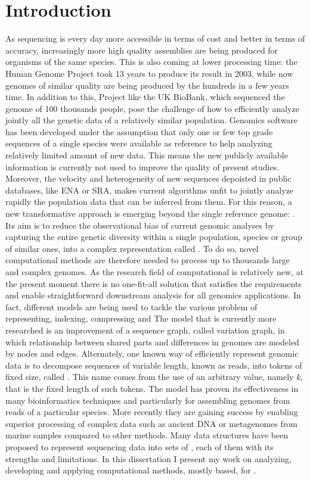 \chapter{Introduction}
\label{sec:intro}

As sequencing is every day more accessible in terms of cost and better in terms of accuracy, increasingly more high quality assemblies are being produced for organisms of the same species. This is also coming at lower processing time: the Human Genome Project took 13 years to produce its result in 2003, while now genomes of similar quality are being produced by the hundreds in a few years time. In addition to this, Project like the UK BioBank, which sequenced the genome of 100 thousands people, pose the challenge of how to efficiently analyze jointly all the genetic data of a relatively similar population.
Genomics software has been developed under the assumption that only one or few top grade sequences of a single species were available as reference to help analyzing relatively limited amount of new data. This means the new publicly available information is currently not used to improve the quality of present studies. Moreover, the velocity and heterogeneity of new sequences depoisted in public databases, like ENA or SRA, makes current algorithms unfit to jointly analyze rapidly the population data that can be inferred from them. 
For this reason, a new transformative approach is emerging beyond the single reference genome: \pangenomics.
Its aim is to reduce the observational bias of current genomic analyses by capturing the entire genetic diversity within a single population, species or group of similar ones, into a complex representation called \pangenome.
To do so, novel computational methods are therefore needed to process up to thousands large and complex genomes. As the research field of computational \pangenomics is relatively new, at the present moment there is no one-fit-all solution that satisfies the requirements and enable straightforward downstream analysis for all genomics applications. In fact, different models are being used to tackle the various problem of representing, indexing, compressing and 
The model that is currently more researched is an improvement of a sequence graph, called variation graph, in which relationship between shared parts and differences in genomes are modeled by nodes and edges.
Alternately, one known way of efficiently represent genomic data is to decompose sequences of variable length, known as reads, into tokens of fixed size, called \kmers. This name comes from the use of an arbitrary value, namely \emph{k}, that is the fixed length of such tokens. The \kmer model has proven its effectiveness in many bioinformatics techniques and particularly for assembling genomes from reads of a particular species. More recently they are gaining success by enabling superior processing of complex data such as ancient DNA or metagenomes from marine samples compared to other methods. Many data structures have been proposed to represent sequencing data into sets of \kmers, each of them with its strengths and limitations.
In this dissertation I present my work on analyzing, developing and applying computational methods, mostly \kmer based, for \pangenomics. 


